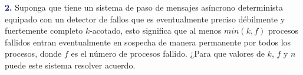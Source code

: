\newline
\textbf{\textcolor{MidnightBlue}{2.}}
Suponga que tiene un sistema de paso de mensajes asíncrono determinista equipado
con un detector de fallos que es eventualmente preciso débilmente y fuertemente
completo $k$-acotado, esto significa que al menos $min(k,f)$ procesos fallidos entran
eventualmente en sospecha de manera permanente por todos los procesos, donde $f$ es
el número de procesos fallido. ¿Para que valores de $k$, $f$ y $n$ puede este sistema
resolver acuerdo.\\
